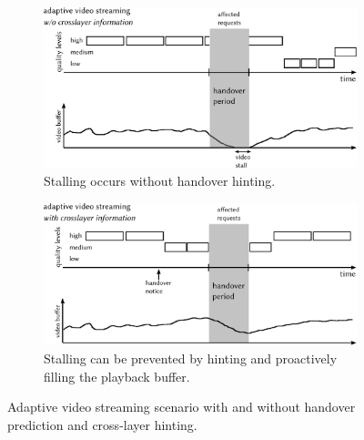 \begin{figure}[htb]
	\centering
	\begin{subfigure}[b]{0.80\textwidth}
		\includegraphics[width=\textwidth]{images/adaptive-streaming-no-cl.pdf}
		\caption{Stalling occurs without handover hinting.}
		\label{c5:fig:streaming-hinting-no-cl}
	\end{subfigure}%

	\begin{subfigure}[b]{0.80\textwidth}
		\includegraphics[width=\textwidth]{images/adaptive-streaming-cl.pdf}
		\caption{Stalling can be prevented by hinting and proactively filling the playback buffer.}
		\label{c5:fig:streaming-hinting-cl}
	\end{subfigure}%
	\caption{Adaptive video streaming scenario with and without handover prediction and cross-layer hinting.}
\label{c5:fig:streaming-hinting}
\end{figure}

